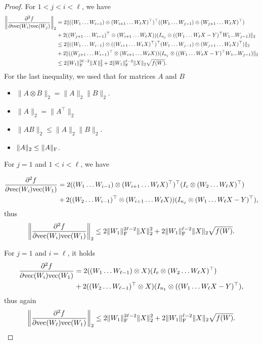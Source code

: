 \documentclass[a4paper,11pt]{article}
\newcommand{\1}{\mathbbm{1}}
\theoremstyle{plain}
\begin{document}
\begin{proof}
For $1<j<i<\ell$, we have
\begin{align*}
   \left \| \frac{\partial^2 f}{\partial \textnormal{vec}(W_i) \textnormal{vec}(W_j)} \right \|_2 & =  2\|((W_1 \dots W_{i-1}) \otimes (W_{i+1} \dots W_{\ell} X)^\top)^\top  ((W_1 \dots W_{j-1}) \otimes (W_{j+1} \dots W_{\ell} X)^\top) \\ & + 2((W_{j+1} \dots W_{i-1})^\top \otimes (W_{i+1} \dots W_{\ell} X)) (I_{n_j} \otimes ((W_1 \dots W_{\ell} X-Y)^\top W_1 ... W_{j-1} )\|_2 \\ &\leq  2 \|((W_1 \dots W_{i-1}) \otimes ((W_{i+1} \dots W_{\ell} X)^\top)^\top  (W_1 \dots W_{j-1}) \otimes (W_{j+1} \dots W_{\ell} X)^\top)\|_2 \\ & +  2 \|((W_{j+1} \dots W_{i-1})^\top \otimes (W_{i+1} \dots W_{\ell} X)) (I_{n_j} \otimes ((W_1 \dots W_{\ell} X-Y)^\top W_1 ... W_{j-1} )\|_2 \\ & \leq  2 \|W_1\|_{\rm F}^{2 \ell-2} \|X\|_2^2 + 2 \|W_1\|_{\rm F}^{\ell-2} \|X\|_2 \sqrt{f(W)}.    
\end{align*}
For the last inequality, we used that for matrices $A$ and $B$
\begin{itemize}
    \item $\|A \otimes B \|_2 = \|A\|_2 \|B\|_2$.
    \item $\|A\|_2 = \|A^\top\|_2$
    \item $\|A B \|_2 \leq \|A\|_2 \|B\|_2$.
    \item $\|A\|_2 \leq \|A\|_{\rm F}$.
\end{itemize}

For $j=1$ and $1<i< \ell$, we have

\begin{align*}
        \frac{\partial^2 f}{\partial \textnormal{vec}(W_i) \textnormal{vec}(W_1)} &= 2 ((W_1 \dots W_{i-1}) \otimes (W_{i+1} \dots W_{\ell} X)^\top)^\top  (I_c \otimes (W_2 \dots W_{\ell} X)^\top) \\ & + 2 ((W_2 \dots W_{i-1})^\top \otimes (W_{i+1} \dots W_{\ell} X)) (I_{n_j} \otimes (W_1 \dots W_{\ell} X-Y)^\top),
    \end{align*}
thus
\begin{equation*}
    \left \|\frac{\partial^2 f}{\partial \textnormal{vec}(W_i) \textnormal{vec}(W_1)} \right\|_2 \leq 2 \|W_1\|_{\rm F}^{2 \ell-2} \|X\|^2_2 + 2 \|W_1\|_{\rm F}^{\ell-2} \|X\|_2 \sqrt{f(W)}.
\end{equation*}


For $j=1$ and $i=\ell$, it holds
\begin{align*}
        \frac{\partial^2 f}{\partial \textnormal{vec}(W_i) \textnormal{vec}(W_1)} &= 2 ((W_1 \dots W_{\ell-1}) \otimes X)  (I_c \otimes (W_2 \dots W_{\ell} X)^\top) \\ & + 2 ((W_2 \dots W_{\ell-1})^\top \otimes X) (I_{n_1} \otimes ((W_1 \dots W_{\ell} X-Y)^\top),
    \end{align*}
    thus again
\begin{equation*}
    \left \|\frac{\partial^2 f}{\partial \textnormal{vec}(W_{\ell}) \textnormal{vec}(W_1)} \right\|_2 \leq 2 \|W_1\|_{\rm F}^{2 \ell-2} \|X\|^2_2 + 2 \|W_1\|_{\rm F}^{\ell-2} \|X\|_2 \sqrt{f(W)}.
\end{equation*}


\end{proof}
\end{document}
